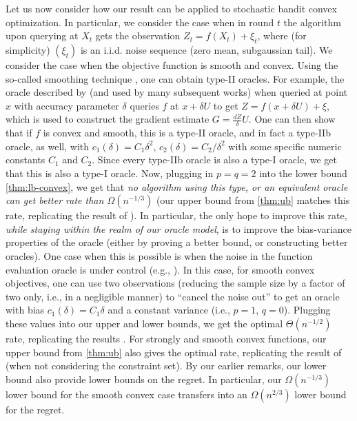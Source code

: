 Let us now consider how our result can be applied to stochastic bandit convex optimization. 
In particular, we consider the case when in round $t$ the algorithm upon querying at $X_t$ gets
the observation $Z_t = f(X_t) + \xi_t$, where (for simplicity) $(\xi_t)$ is an i.i.d. noise sequence (zero mean, subgaussian tail).
We consider the case when the objective function is smooth and convex.
Using the so-called smoothing technique \citep{PoTsy90,flaxman2005online,HaLe14:SOC}, one can obtain
type-II oracles. For example, the oracle described by \citet{flaxman2005online} (and used by many subsequent works)
when queried at point $x$ with accuracy parameter $\delta$ queries $f$ at $x+\delta U$ to get
$Z=f(x+\delta U)+\xi$, which is used to construct the gradient estimate $G = \frac{d Z}{\delta} U$.
One can then show that if $f$ is convex and smooth, this is a type-II oracle, and in fact a type-IIb oracle, as well, with 
$c_1(\delta)=C_1 \delta^2$, $c_2(\delta) = C_2/\delta^2$ with some specific numeric constants $C_1$ and $C_2$.
Since every type-IIb oracle is also a type-I oracle, we get that this is also a type-I oracle.
Now, plugging in $p=q=2$ into the lower bound \cref{thm:lb-convex}, we get that \emph{no algorithm using this type, or an
equivalent oracle can get better rate than $\Omega(n^{-1/3})$} (our upper bound from \cref{thm:ub} matches this rate,
replicating the result of \citet{saha2011improved}).
In particular, the only hope to improve this rate, \emph{while staying within the realm of our oracle model}, is to improve the bias-variance properties of the oracle (either by proving a better bound, or constructing better oracles).
One case when this is possible is when the noise in the function evaluation oracle is under control
(e.g., \citep{Ne11:TR,duchi2015optimal}). 
In this case, for smooth convex objectives, 
one can use two observations (reducing the sample size by a factor of two only, i.e., in a negligible manner) 
to ``cancel the noise out''  to get an oracle with bias $c_1(\delta) = C_1\delta$ 
and a constant variance (i.e., $p=1$, $q=0$). Plugging these values into our upper and lower bounds, we get the optimal $\Theta(n^{-1/2})$ rate, replicating the results \citet{Ne11:TR,duchi2015optimal}.
For strongly and smooth convex functions, our upper bound from  \cref{thm:ub}  also gives the optimal rate,
replicating the result of \citet{HaLe14:SOC} (when not considering the constraint set).
By our earlier remarks, our lower bound also provide lower bounds on the regret. In particular,
our $\Omega(n^{-1/3})$ lower bound for the smooth convex case transfers into an $\Omega(n^{2/3})$ lower bound
for the regret.

